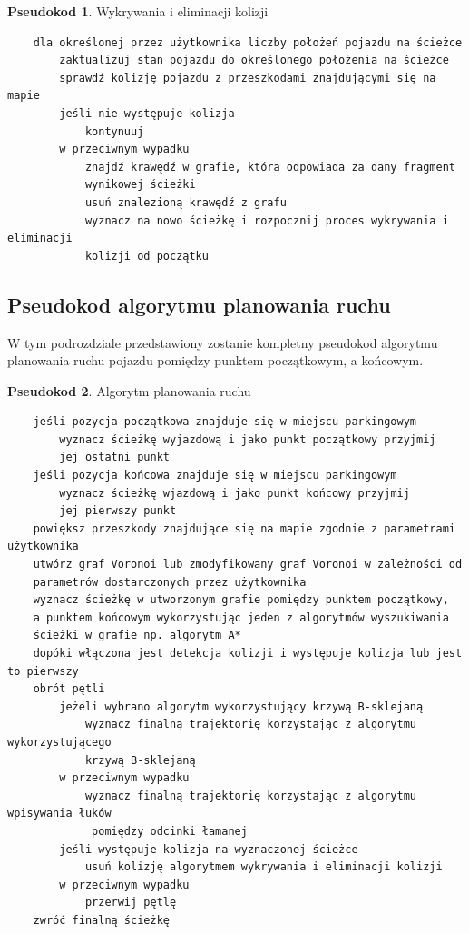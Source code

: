 \documentclass[a4paper,11pt,twoside]{report}
\theoremstyle{definition}
\newtheorem{pseudokod}{Pseudokod}[subsection]
\begin{document}
\newpage

\begin{pseudokod}
Wykrywania i eliminacji kolizji
\begin{verbatim}
    dla określonej przez użytkownika liczby położeń pojazdu na ścieżce
        zaktualizuj stan pojazdu do określonego położenia na ścieżce
        sprawdź kolizję pojazdu z przeszkodami znajdującymi się na mapie
        jeśli nie występuje kolizja
            kontynuuj
        w przeciwnym wypadku
            znajdź krawędź w grafie, która odpowiada za dany fragment 
            wynikowej ścieżki
            usuń znalezioną krawędź z grafu
            wyznacz na nowo ścieżkę i rozpocznij proces wykrywania i eliminacji 
            kolizji od początku
\end{verbatim}
\end{pseudokod}

\subsection{Pseudokod algorytmu planowania ruchu}

W tym podrozdziale przedstawiony zostanie kompletny pseudokod algorytmu planowania ruchu pojazdu pomiędzy punktem początkowym, a końcowym.

\begin{pseudokod}
Algorytm planowania ruchu
\begin{verbatim}
    jeśli pozycja początkowa znajduje się w miejscu parkingowym
        wyznacz ścieżkę wyjazdową i jako punkt początkowy przyjmij 
        jej ostatni punkt
    jeśli pozycja końcowa znajduje się w miejscu parkingowym
        wyznacz ścieżkę wjazdową i jako punkt końcowy przyjmij 
        jej pierwszy punkt
    powiększ przeszkody znajdujące się na mapie zgodnie z parametrami użytkownika
    utwórz graf Voronoi lub zmodyfikowany graf Voronoi w zależności od 
    parametrów dostarczonych przez użytkownika
    wyznacz ścieżkę w utworzonym grafie pomiędzy punktem początkowy, 
    a punktem końcowym wykorzystując jeden z algorytmów wyszukiwania 
    ścieżki w grafie np. algorytm A*
    dopóki włączona jest detekcja kolizji i występuje kolizja lub jest to pierwszy 
    obrót pętli
        jeżeli wybrano algorytm wykorzystujący krzywą B-sklejaną
            wyznacz finalną trajektorię korzystając z algorytmu wykorzystującego 
            krzywą B-sklejaną
        w przeciwnym wypadku
            wyznacz finalną trajektorię korzystając z algorytmu wpisywania łuków
             pomiędzy odcinki łamanej
        jeśli występuje kolizja na wyznaczonej ścieżce
            usuń kolizję algorytmem wykrywania i eliminacji kolizji
        w przeciwnym wypadku
            przerwij pętlę
    zwróć finalną ścieżkę
\end{verbatim}
\end{pseudokod}
\end{document}
